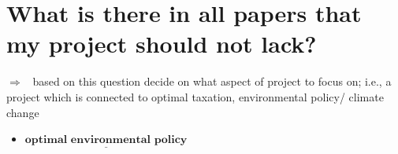 \documentclass[12pt]{article}
\newcommand{\ar}{$\Rightarrow$ \ }
\begin{document}

\section{What is there in all papers that my project should not lack?} \ar based on this question decide on what aspect of project to focus on; i.e.,
a project which is connected to optimal taxation, environmental policy/ climate change

\begin{itemize}
	\item $\underline{\textbf{optimal environmental policy}}$
	\begin{itemize}


\end{itemize}
\end{itemize}
\end{document}
